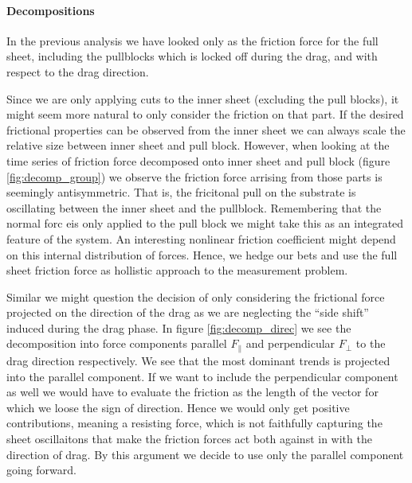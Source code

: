 \paragraph*{Decompositions}

In the previous analysis we have looked only as the friction force for the full
sheet, including the pullblocks which is locked off during the drag, and with
respect to the drag direction. \par
Since we are only applying cuts to the inner sheet (excluding the pull blocks),
it might seem more natural to only consider the friction on that part. If the
desired frictional properties can be observed from the inner sheet we can always
scale the relative size between inner sheet and pull block. However, when
looking at the time series of friction force decomposed onto inner sheet and
pull block (figure \ref{fig:decomp_group}) we observe the friction force arrising
from those parts is seemingly antisymmetric. That is, the fricitonal pull on the
substrate is oscillating between the inner sheet and the pullblock. Remembering
that the normal forc eis only applied to the pull block we might take this as an
integrated feature of the system. An interesting nonlinear friction coefficient
might depend on this internal distribution of forces. Hence, we hedge our bets and
use the full sheet friction force as hollistic approach to the measurement problem.

\par
Similar we might question the decision of
only considering the frictional force projected on the direction of the drag as
we are neglecting the ``side shift'' induced during the drag phase. In figure \ref{fig:decomp_direc} we see the decomposition into force components parallel $F_{\parallel}$ and perpendicular $F_{\perp}$ to the drag direction respectively. We see that the most dominant trends is projected into the parallel component. If we want to include the perpendicular component as well we would have to evaluate the friction as the length of the vector for which we loose the sign of direction. Hence we would only get positive contributions, meaning a resisting force, which is not faithfully capturing the sheet oscillaitons that make the friction forces act both against in with the direction of drag. By this argument we decide to use only the parallel component going forward. 

